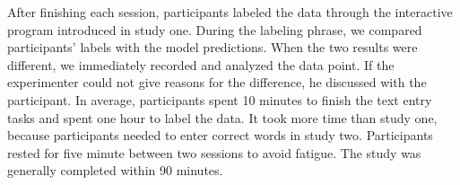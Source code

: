 
After finishing each session, participants labeled the data through the interactive program introduced in study one. During the labeling phrase, we compared participants' labels with the model predictions. When the two results were different, we immediately recorded and analyzed the data point. If the experimenter could not give reasons for the difference, he discussed with the participant.
In average, participants spent 10 minutes to finish the text entry tasks and spent one hour to label the data. It took more time than study one, because participants needed to enter correct words in study two. Participants rested for five minute between two sessions to avoid fatigue. The study was generally completed within 90 minutes.





